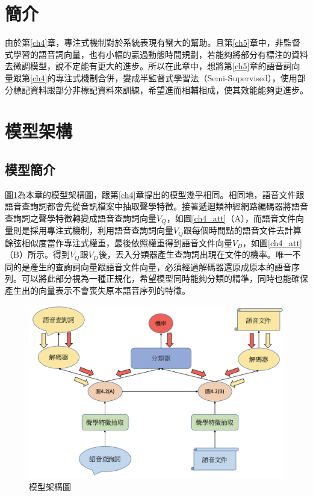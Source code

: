 \section{簡介}
由於第\ref{ch4}章，專注式機制對於系統表現有蠻大的幫助。且第\ref{ch5}章中，非監督式學習的語音詞向量，也有小幅的贏過動態時間規劃，若能夠將部分有標注的資料去微調模型，說不定能有更大的進步。所以在此章中，想將第\ref{ch5}章的語音詞向量跟第\ref{ch4}的專注式機制合併，變成半監督式學習法（Semi-Supervised），使用部分標記資料跟部分非標記資料來訓練，希望進而相輔相成，使其效能能夠更進步。
\section{模型架構}
\subsection{模型簡介}
圖\ref{ch6_model}為本章的模型架構圖，跟第\ref{ch4}章提出的模型幾乎相同。相同地，語音文件跟語音查詢詞都會先從音訊檔案中抽取聲學特徵。接著遞迴類神經網路編碼器將語音查詢詞之聲學特徵轉變成語音查詢詞向量$V_Q$，如圖\ref{ch4_att}（A），而語音文件向量則是採用專注式機制，利用語音查詢詞向量$V_Q$跟每個時間點的語音文件去計算餘弦相似度當作專注式權重，最後依照權重得到語音文件向量$V_D$，如圖\ref{ch4_att}（B）所示。得到$V_Q$跟$V_D$後，丟入分類器產生查詢詞出現在文件的機率。唯一不同的是產生的查詢詞向量跟語音文件向量，必須經過解碼器還原成原本的語音序列。可以將此部分視為一種正規化，希望模型同時能夠分類的精準，同時也能確保產生出的向量表示不會喪失原本語音序列的特徵。

\begin{figure}[h]
\centering
\includegraphics[scale=0.5]{images/ch6_model.png} 
\caption{模型架構圖}
\label{ch6_model}
\end{figure}
